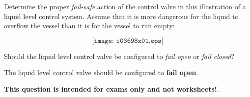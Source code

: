 

Determine the proper {\it fail-safe} action of the control valve in this illustration of a liquid level control system.  Assume that it is more dangerous for the liquid to overflow the vessel than it is for the vessel to run empty:

$$\texttt{[image: i03698x01.eps]}$$

Should the liquid level control valve be configured to {\it fail open} or {\it fail closed}?







The liquid level control valve should be configured to {\bf fail open}.







{\bf This question is intended for exams only and not worksheets!}.



